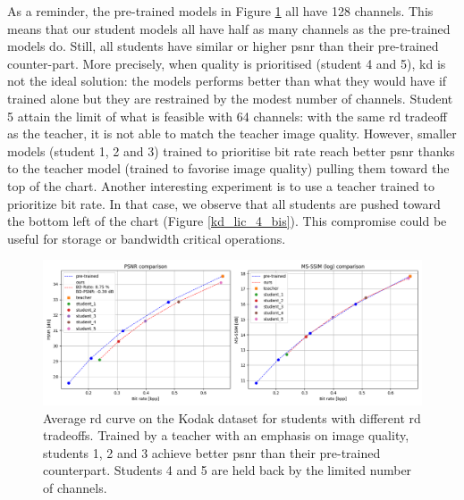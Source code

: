 \documentclass{article}
\begin{document}
As a reminder, the pre-trained models in Figure \ref{kd_lic_4} all have 128 channels. This means that our student models all have half as many channels as the pre-trained models do. Still, all students have similar or higher \acrshort{psnr} than their pre-trained counter-part. More precisely, when quality is prioritised (student 4 and 5), \acrshort{kd} is not the ideal solution: the models performs better than what they would have if trained alone but they are restrained by the modest number of channels. Student 5 attain the limit of what is feasible with 64 channels: with the same \acrshort{rd} tradeoff as the teacher, it is not able to match the teacher image quality. However, smaller models (student 1, 2 and 3) trained to prioritise bit rate reach better \acrshort{psnr} thanks to the teacher model (trained to favorise image quality) pulling them toward the top of the chart. Another interesting experiment is to use a teacher trained to prioritize bit rate. In that case, we observe that all students are pushed toward the bottom left of the chart (Figure \ref{kd_lic_4_bis}). This compromise could be useful for storage or bandwidth critical operations.

\begin{figure}
    \centering
    \includegraphics[width=15cm]{../img/kd_lic_rd_lambda_1.png}
    \caption[Average \acrshort{rd} curve on the Kodak dataset for students with different \acrshort{rd} tradeoffs.]{Average \acrshort{rd} curve on the Kodak dataset for students with different \acrshort{rd} tradeoffs. Trained by a teacher with an emphasis on image quality, students 1, 2 and 3 achieve better \acrshort{psnr} than their pre-trained counterpart. Students 4 and 5 are held back by the limited number of channels.}
    \label{kd_lic_4}
\end{figure}
\end{document}

